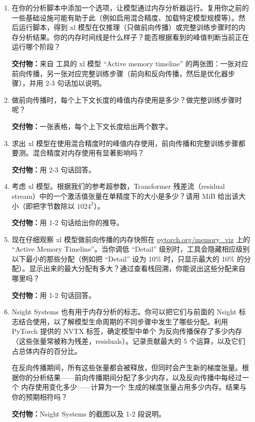 \begin{enumerate}[label=(\alph*)]
  \item 在你的分析脚本中添加一个选项，让模型通过内存分析器运行。复用你之前的一些基础设施可能有助于此（例如启用混合精度、加载特定模型规模等）。然后运行脚本，得到 xl 模型在仅推理（只做前向传播）或完整训练步骤时的内存分析结果。你的内存时间线是什么样子？能否根据看到的峰值判断当前正在运行哪个阶段？

  \textbf{交付物：}来自  工具的 xl 模型 “Active memory timeline” 的两张图：一张对应前向传播，另一张对应完整训练步骤（前向和反向传播，然后是优化器步骤），并用 2-3 句话加以说明。

  \item 做前向传播时，每个上下文长度的峰值内存使用是多少？做完整训练步骤时呢？

  \textbf{交付物：}一张表格，每个上下文长度给出两个数字。

  \item 求出 xl 模型在使用混合精度时的峰值内存使用，前向传播和完整训练步骤都要测。混合精度对内存使用有显著影响吗？

  \textbf{交付物：}用 2-3 句话回答。

  \item 考虑 xl 模型。根据我们的参考超参数，Transformer 残差流（residual stream）中的一个激活值张量在单精度下的大小是多少？请用 MiB 给出该大小（即把字节数除以 $1024^2$）。

  \textbf{交付物：}用 1-2 句话给出你的推导。

  \item 现在仔细观察 xl 模型做前向传播的内存快照在 \url{pytorch.org/memory_viz} 上的 “Active Memory Timeline”。当你调低 “Detail” 级别时，工具会隐藏相应级别以下最小的那些分配（例如把 “Detail” 设为 10\% 时，只显示最大的 10\% 的分配）。显示出来的最大分配有多大？通过查看栈回溯，你能说出这些分配来自哪里吗？

  \textbf{交付物：}用 1-2 句话回答。

  \item Nsight Systems 也有用于内存分析的标志。你可以把它们与前面的 Nsight 标志结合使用，以了解模型生命周期的不同步骤中发生了哪些分配。利用 PyTorch 提供的 NVTX 标签，确定模型中单个  为反向传播保存了多少内存（这些张量常被称为残差，residuals）。记录贡献最大的 5 个运算，以及它们占总体内存的百分比。

  在反向传播期间，所有这些张量都会被释放，但同时会产生新的梯度张量。根据你的分析结果——前向传播期间分配了多少内存，以及反向传播中每经过一个  内存使用变化多少——计算为一个  生成的梯度张量占用多少内存。结果与你的预期相符吗？

  \textbf{交付物：}Nsight Systems 的截图以及 1-2 段说明。
\end{enumerate}

